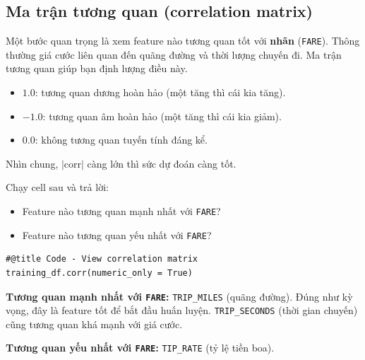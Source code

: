 \documentclass[12pt,a4paper]{article}
\begin{document}
\subsection{Ma trận tương quan (correlation matrix)}

\begin{dongco}[title={Chọn feature nên dựa vào tương quan}]
Một bước quan trọng là xem feature nào tương quan tốt với \textbf{nhãn} (\texttt{FARE}).
Thông thường giá cước liên quan đến quãng đường và thời lượng chuyến đi.
Ma trận tương quan giúp bạn định lượng điều này.
\end{dongco}

\begin{ynghia}[title={Ý nghĩa giá trị tương quan}]
\begin{itemize}
  \item \(1.0\): tương quan dương hoàn hảo (một tăng thì cái kia tăng).
  \item \(-1.0\): tương quan âm hoàn hảo (một tăng thì cái kia giảm).
  \item \(0.0\): không tương quan tuyến tính đáng kể.
\end{itemize}
Nhìn chung, \(|\text{corr}|\) càng lớn thì sức dự đoán càng tốt.
\end{ynghia}

\begin{phuongphap}[title={Hướng dẫn kiểm tra hiểu}]
Chạy cell sau và trả lời:
\begin{itemize}
  \item Feature nào tương quan mạnh nhất với \texttt{FARE}?
  \item Feature nào tương quan yếu nhất với \texttt{FARE}?
\end{itemize}
\end{phuongphap}

\begin{lstlisting}
#@title Code - View correlation matrix
training_df.corr(numeric_only = True)
\end{lstlisting}

\begin{vidu}[title={Đáp án tham khảo}]
\textbf{Tương quan mạnh nhất với \texttt{FARE}:} \texttt{TRIP\_MILES} (quãng đường).
Đúng như kỳ vọng, đây là feature tốt để bắt đầu huấn luyện.
\texttt{TRIP\_SECONDS} (thời gian chuyến) cũng tương quan khá mạnh với giá cước.

\medskip
\textbf{Tương quan yếu nhất với \texttt{FARE}:} \texttt{TIP\_RATE} (tỷ lệ tiền boa).
\end{vidu}
\end{document}
